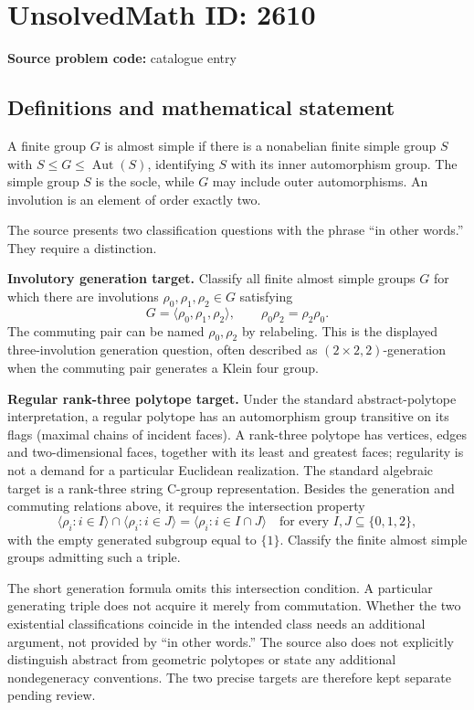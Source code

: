 \documentclass[11pt]{article}
\begin{document}
\section*{UnsolvedMath ID: 2610}
\textbf{Source problem code:} catalogue entry
\subsection{Definitions and mathematical statement}
A finite group $G$ is almost simple if there is a nonabelian finite simple group $S$ with $S\leq G\leq\operatorname{Aut}(S)$, identifying $S$ with its inner automorphism group. The simple group $S$ is the socle, while $G$ may include outer automorphisms. An involution is an element of order exactly two.

The source presents two classification questions with the phrase ``in other words.'' They require a distinction.

\textbf{Involutory generation target.} Classify all finite almost simple groups $G$ for which there are involutions $\rho_0,\rho_1,\rho_2\in G$ satisfying
\[
 G=\langle\rho_0,\rho_1,\rho_2\rangle,\qquad
 \rho_0\rho_2=\rho_2\rho_0.
\]
The commuting pair can be named $\rho_0,\rho_2$ by relabeling. This is the displayed three-involution generation question, often described as $(2\times2,2)$-generation when the commuting pair generates a Klein four group.

\textbf{Regular rank-three polytope target.} Under the standard abstract-polytope interpretation, a regular polytope has an automorphism group transitive on its flags (maximal chains of incident faces). A rank-three polytope has vertices, edges and two-dimensional faces, together with its least and greatest faces; regularity is not a demand for a particular Euclidean realization. The standard algebraic target is a rank-three string C-group representation. Besides the generation and commuting relations above, it requires the intersection property
\[
 \langle\rho_i:i\in I\rangle\cap\langle\rho_i:i\in J\rangle
 =\langle\rho_i:i\in I\cap J\rangle
 \quad\text{for every }I,J\subseteq\{0,1,2\},
\]
with the empty generated subgroup equal to $\{1\}$. Classify the finite almost simple groups admitting such a triple.

The short generation formula omits this intersection condition. A particular generating triple does not acquire it merely from commutation. Whether the two existential classifications coincide in the intended class needs an additional argument, not provided by ``in other words.'' The source also does not explicitly distinguish abstract from geometric polytopes or state any additional nondegeneracy conventions. The two precise targets are therefore kept separate pending review.
\end{document}
